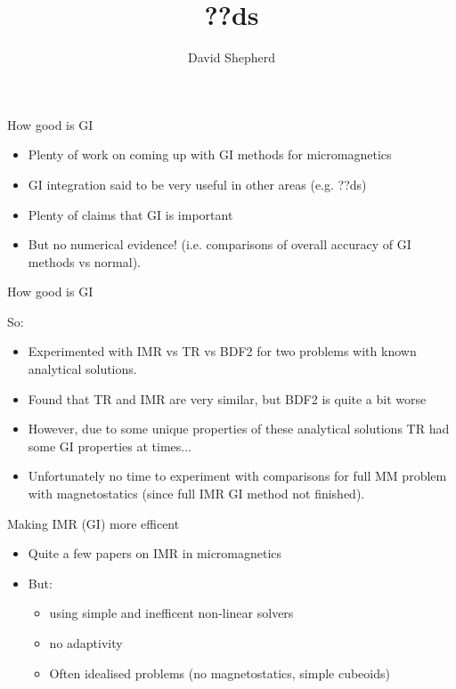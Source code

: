 \documentclass[18pt]{beamer}
\title[??ds]{??ds}
\author[David Shepherd]{David Shepherd}
\institute[UoM]{The University of Manchester}
\newlength{\wideitemsep}
\let\olditem\item
\renewcommand{\item}{\setlength{\itemsep}{\wideitemsep}\olditem}
\begin{document}
\begin{frame}
  \titlepage
\end{frame}

\begin{frame}{How good is GI}

  \begin{itemize}
  \item Plenty of work on coming up with GI methods for micromagnetics
  \item GI integration said to be very useful in other areas (e.g. ??ds)
  \item Plenty of claims that GI is important
  \item But no numerical evidence! (i.e. comparisons of overall accuracy of
    GI methods vs normal).
  \end{itemize}

\end{frame}

\begin{frame}{How good is GI}

  So:
  \begin{itemize}
  \item Experimented with IMR vs TR vs BDF2 for two problems with
    known analytical solutions.
  \item Found that TR and IMR are very similar, but BDF2 is quite a bit worse
  \item However, due to some unique properties of these analytical
    solutions TR had some GI properties at times...
  \item Unfortunately no time to experiment with comparisons for full MM
    problem with magnetostatics (since full IMR GI method not finished).
  \end{itemize}
  
\end{frame}


\begin{frame}{Making IMR (GI) more efficent}

  \begin{itemize}
  \item Quite a few papers on IMR in micromagnetics
  \item But:
    \begin{itemize}
    \item using simple and inefficent non-linear solvers
    \item no adaptivity
    \item Often idealised problems (no magnetostatics, simple cubeoids)
    \end{itemize}
  \end{itemize}
\end{frame}
\end{document}
